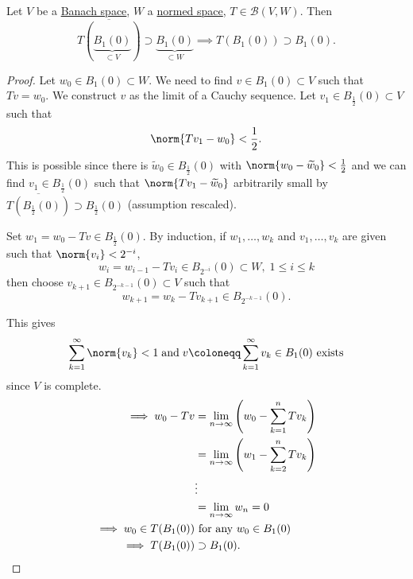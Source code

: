 \documentclass{article}
\begin{document}
\begin{lemma}
    Let $V$ be a \hyperlink{def:banach}{Banach space}, $W$ a \hyperlink{def:normedVectorSpace}{normed space}, $T \in \mathcal{B}(V, W)$. Then
    \begin{equation*}
        \overline{T(\underbrace{B_1(0)}_{\subset V})} \supset \underbrace{B_1(0)}_{\subset W} \implies T(B_1(0)) \supset B_1(0).
    \end{equation*}
\end{lemma}

\begin{proof}
    Let $w_0 \in B_1(0) \subset W$. We need to find $v \in B_1(0) \subset V$ such that $T v = w_0$. We construct $v$ as the limit of a Cauchy sequence.
    Let $v_1 \in B_{\frac{1}{2}}(0) \subset V$ such that
    \begin{equation*}\norm{Tv_1 - w_0} < \frac{1}{2}.\end{equation*}
    This is possible since there is $\widetilde{w}_0 \in B_{\frac{1}{2}}(0)$ with $\norm{w_0 - \widetilde{w}_0} < \frac{1}{2}$ and we can find $v_1 \in B_\frac{1}{2}(0)$ such that $\norm{Tv_1 - \widetilde{w}_0}$ arbitrarily small by $\overline{T(B_\frac{1}{2}(0))} \supset B_\frac{1}{2}(0)$ (assumption rescaled).

    Set $w_1 = w_0 - T v \in B_\frac{1}{2}(0)$. By induction, if $w_1, \dotsc, w_k$ and $v_1, \dotsc, v_k$ are given such that $\norm{v_i} < 2^{-i}$,
    \begin{equation*}
        w_i = w_{i-1} - T v_i \in B_{2^{-i}}(0) \subset W, \; 1 \leq i \leq k
    \end{equation*}
    then choose $v_{k+1} \in B_{2^{-k-1}}(0) \subset V$ such that
    \begin{equation*}
        w_{k+1} = w_k - T v_{k+1} \in B_{2^{-k-1}}(0).
    \end{equation*}

    This gives
    \begin{equation*}
    \sum_{k=1}^\infty \norm{v_k} < 1 \; \text{and} \; v \coloneqq \sum_{k=1}^\infty v_k \in B_1(0) \text{ exists}
    \end{equation*}
    since $V$ is complete.
    \begin{align*}
        \implies w_0 - Tv &= \lim_{n \to \infty} \left(w_0 - \sum_{k=1}^n T v_k\right) \\
                          &= \lim_{n \to \infty} \left(w_1 - \sum_{k=2}^n T v_k\right) \\
                          &\vdots \\
                          &= \lim_{n \to \infty} w_n = 0 \\
        \implies w_0 \in T(B_1(0)) &\text{ for any } w_0 \in B_1(0) \\
        \implies T(B_1(0)) &\supset B_1(0). \qedhere
    \end{align*}
\end{proof}
\end{document}
